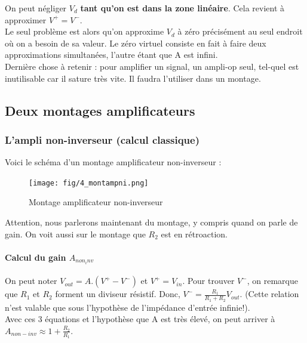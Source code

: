 \documentclass[a4paper]{article}
\begin{document}
    On peut négliger $V_d$ \textbf{tant qu'on est dans la zone linéaire}. Cela
    revient à approximer $V^+ = V^-$.\\

    Le seul problème est alors qu'on approxime $V_d$ à zéro précisément au seul
    endroit où on a besoin de sa valeur. Le zéro virtuel consiste en fait à faire
    deux approximations simultanées, l'autre étant que A est infini.\\

    Dernière chose à retenir : pour amplifier un signal, un ampli-op seul, tel-quel
    est inutilisable car il sature très vite. Il faudra l'utiliser dans un montage.


    \subsection{Deux montages amplificateurs}
    \subsubsection{L'ampli non-inverseur (calcul classique)}

    Voici le schéma d'un montage amplificateur non-inverseur : 
    \begin{figure}[H]
        \begin{center}
            \texttt{[image: fig/4\_montampni.png]}
            \caption{Montage amplificateur non-inverseur}
            \label{fig:4_montampni}
        \end{center}
    \end{figure}
    Attention, nous parlerons maintenant du montage, y compris quand on parle de gain.
    On voit aussi sur le montage que $R_2$ est en rétroaction.

    \paragraph{Calcul du gain $A_{non_inv}$}
    On peut noter $V_{out} = A.(V^+-V^-)$ et $V^+ = V_{in}$. Pour trouver $V^-$, 
    on remarque que $R_1$ et $R_2$ forment un diviseur résistif. Donc, 
    $V^- = \frac{R_1}{R_1+R_2}V_{out}$. (Cette relation n'est valable que
    sous l'hypothèse de l'impédance d'entrée infinie!).\\

    Avec ces 3 équations et l'hypothèse que A est très élevé, on peut arriver 
    à $A_{non-inv} \approx 1 + \frac{R_2}{R_1}$.\\
\end{document}
